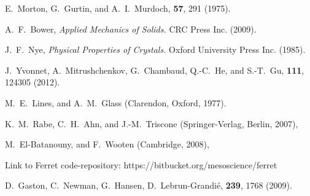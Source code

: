 \documentclass[22pt]{article} %
\begin{document}
%
%


\begin{thebibliography}{1}

E.~Morton, G.~Gurtin, and A.~I.~Murdoch, 
 \textbf{57}, 291 (1975).

A.~F.~Bower,
\newblock \emph{Applied Mechanics of Solids.} CRC Press Inc. (2009).

J.~F.~Nye,
\newblock \emph{Physical Properties of Crystals.} Oxford University Press Inc. (1985).

J.~Yvonnet, A.~Mitrushchenkov, G.~Chambaud, Q.-C.~He, and S.-T.~Gu, 
 \textbf{111}, 124305 (2012).

M.~E.~Lines, and A.~M.~Glass 
 (Clarendon, Oxford, 1977).

K.~M.~Rabe, C.~H.~Ahn, and J.-M.~Triscone
 (Springer-Verlag, Berlin, 2007),

M.~El-Batanouny, and F.~Wooten
 (Cambridge, 2008),

Link to Ferret code-repository: https://bitbucket.org/mesoscience/ferret

D.~Gaston, C.~Newman, G.~Hansen, D.~Lebrun-Grandi{\'{e}},
 \textbf{239}, 1768 (2009).


\end{thebibliography}
\end{document}
